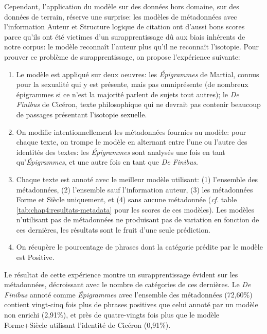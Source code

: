 Cependant, l'application du modèle sur des données hors domaine, sur des données de terrain, réserve une surprise: les modèles de métadonnées avec l'information Auteur et Structure logique de citation ont d'aussi bons scores parce qu'ils ont été victimes d'un surapprentissage dû aux biais inhérents de notre corpus: le modèle reconnaît l'auteur plus qu'il ne reconnaît l'isotopie. Pour prouver ce problème de surapprentissage, on propose l'expérience suivante:
\begin{enumerate}
    \item Le modèle est appliqué sur deux oeuvres: les \textit{Épigrammes} de Martial, connus pour la sexualité qui y est présente, mais pas omniprésente (de nombreux épigrammes si ce n'est la majorité parlent de sujets tout autres); le \textit{De Finibus} de Cicéron, texte philosophique qui ne devrait pas contenir beaucoup de passages présentant l'isotopie sexuelle.
    \item On modifie intentionnellement les métadonnées fournies au modèle: pour chaque texte, on trompe le modèle en alternant entre l'une ou l'autre des identités des textes: les \textit{Épigrammes} sont analysés une fois en tant qu'\textit{Épigrammes}, et une autre fois en tant que \textit{De Finibus}.
    \item Chaque texte est annoté avec le meilleur modèle utilisant: (1) l'ensemble des métadonnées, (2) l'ensemble sauf l'information auteur, (3) les métadonnées Forme et Siècle uniquement, et (4) sans aucune métadonnée (\textit{cf.} table \ref{tab:chap4:resultats-metadata} pour les scores de ces modèles). Les modèles n'utilisant pas de métadonnées ne produisant pas de variation en fonction de ces dernières, les résultats sont le fruit d'une seule prédiction.
    \item On récupère le pourcentage de phrases dont la catégorie prédite par le modèle est Positive.
\end{enumerate}
Le résultat de cette expérience montre un surapprentissage évident sur les métadonnées, décroissant avec le nombre de catégories de ces dernières. Le \textit{De Finibus} annoté comme \textit{Épigrammes} avec l'ensemble des métadonnées (72,60\%) contient vingt-cinq fois plus de phrases positives que celui annoté   par un modèle non enrichi (2,91\%), et près de quatre-vingts fois plus que le modèle Forme+Siècle utilisant l'identité de Cicéron (0,91\%).

